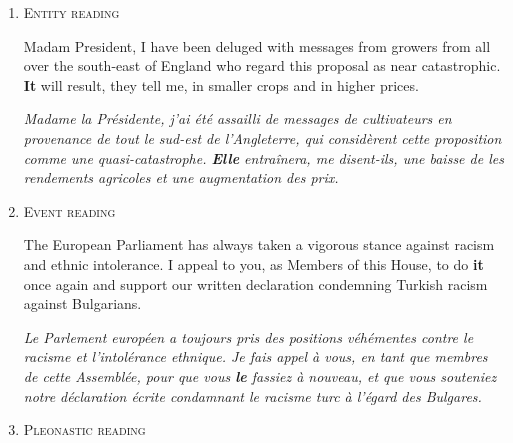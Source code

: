 \documentclass[10pt, a4paper]{article}
\begin{document}
%

\begin{enumerate}

\item\label{ex:nominal} \textsc{Entity reading}

Madam President, I have been deluged with messages from growers from all over 
the south-east of England who regard this proposal as near catastrophic. 
\textbf{It} will result, they tell me, in smaller crops and in higher prices. 

\textit{Madame la Présidente, j'ai été assailli de messages de cultivateurs 
en provenance de tout le sud-est de l'Angleterre, qui considèrent cette 
proposition comme une quasi-catastrophe. \textbf{Elle} entraînera, me 
disent-ils, une baisse de les rendements agricoles et une augmentation des 
prix.}



\item\label{ex:event}\textsc{Event reading}

The European Parliament has always taken a vigorous stance against racism and
ethnic intolerance. I appeal to you, as Members of this House, to do
\textbf{it} once again and support our written declaration condemning Turkish racism against Bulgarians.

\textit{Le Parlement européen a toujours pris des positions véhémentes contre le racisme
et l'intolérance ethnique. Je fais appel à vous, en tant que membres de cette
Assemblée, pour que vous \textbf{le} fassiez à nouveau, et que vous souteniez notre
déclaration écrite condamnant le racisme turc à l'égard des Bulgares.} 



\item\label{ex:pleo} \textsc{Pleonastic reading}


\end{enumerate}
\end{document}

